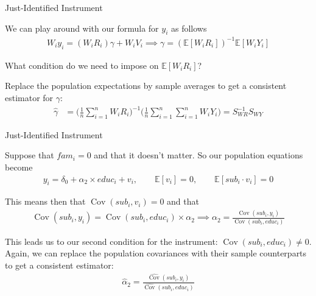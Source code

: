 \begin{frame}{Just-Identified Instrument}

    We can play around with our formula for $y_i$ as follows
    \begin{align*}
        W_i y_i = (W_i R_i) \gamma + W_i V_i \implies \gamma = (\mathbb{E}[W_i R_i])^{-1} \mathbb{E}[W_i Y_i]    
    \end{align*}

    What condition do we need to impose on $\mathbb{E}[W_i R_i]$?

    \vspace{2em}
    
    Replace the population expectations by sample averages to get a consistent estimator for $\gamma$:
    \begin{align*}
        \hat{\gamma} &= \Biggr( \frac{1}{n} \sum_{i=1}^n W_i R_i \Biggr)^{-1} \Biggr( \frac{1}{n} \sum_{i=1}^n \sum_{i=1}^n W_i Y_i \Biggr) = S_{WR}^{-1} S_{WY}
    \end{align*}
    
\end{frame}

\begin{frame}{Just-Identified Instrument}

    Suppose that $fam_i = 0$ and that it doesn't matter. So our population equations become
    \begin{align*}
        y_i = \delta_0 + \alpha_2 \times educ_i + v_i, \qquad \mathbb{E}[v_i] = 0, \qquad \mathbb{E}[sub_i \cdot v_i] = 0
    \end{align*}

    This means then that $\operatorname{Cov}(sub_i, v_i) = 0$ and that
    \begin{align*}
        \operatorname{Cov}(sub_i, y_i) = \operatorname{Cov}(sub_i, educ_i) \times \alpha_2 \implies \alpha_2 = \frac{\operatorname{Cov}(sub_i, y_i)}{\operatorname{Cov}(sub_i, educ_i)}
    \end{align*}

    This leads us to our second condition for the instrument: $\operatorname{Cov}(sub_i, educ_i) \neq 0$. Again, we can replace the population covariances with their sample counterparts to get a consistent estimator:
    \begin{align*}
        \hat{\alpha}_2 = \frac{\widehat{\operatorname{Cov}}(sub_i, y_i)}{\widehat{\operatorname{Cov}}(sub_i, educ_i)}
    \end{align*}
\end{frame}

